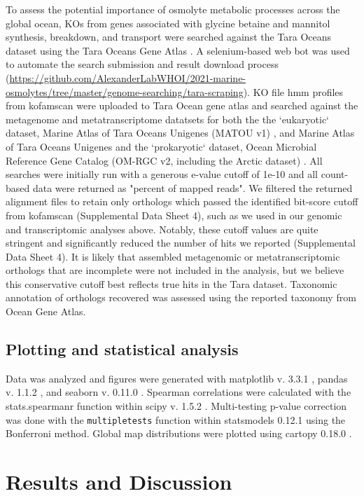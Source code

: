 \documentclass[utf8]{frontiersSCNS} %
\begin{document}
To assess the potential importance of osmolyte metabolic processes across the global ocean, KOs from genes associated with glycine betaine and mannitol synthesis, breakdown, and transport were searched against the Tara Oceans dataset using the Tara Oceans Gene Atlas \citep{Villar_2018}. A selenium-based web bot was used to automate the search submission and result download process (\url{https://github.com/AlexanderLabWHOI/2021-marine-osmolytes/tree/master/genome-searching/tara-scraping}). KO file hmm profiles from kofamscan were uploaded to Tara Ocean gene atlas and searched against the metagenome and metatranscriptome datatsets for both the the `eukaryotic` dataset, Marine Atlas of Tara Oceans Unigenes (MATOU v1) \citep{Carradec2018}, and Marine Atlas of Tara Oceans Unigenes and the `prokaryotic` dataset, Ocean Microbial Reference Gene Catalog (OM-RGC v2, including the Arctic dataset) \citep{Salazar_2019}. All searches were initially run with a generous e-value cutoff of 1e-10 and all count-based data were returned as "percent of mapped reads". We filtered the returned alignment files to retain only orthologs which passed the identified bit-score cutoff from kofamscan (Supplemental Data Sheet 4), such as we used in our genomic and transcriptomic analyses above. Notably, these cutoff values are quite stringent and significantly reduced the number of hits we reported (Supplemental Data Sheet 4). It is likely that assembled metagenomic or metatranscriptomic orthologs that are incomplete were not included in the analysis, but we believe this conservative cutoff best reflects true hits in the Tara dataset. Taxonomic annotation of orthologs recovered was assessed using the reported taxonomy from Ocean Gene Atlas. 

\subsection{Plotting and statistical analysis}

Data was analyzed and figures were generated with matplotlib v. 3.3.1 \citep{Hunter:2007}, pandas v. 1.1.2 \citep{reback2020pandas}, and seaborn v. 0.11.0 \citep{waskom2020seaborn}. Spearman correlations were calculated with the stats.spearmanr function within scipy v. 1.5.2 \citep{2020SciPy-NMeth}. Multi-testing p-value correction was done with the \texttt{multipletests} function within statsmodels 0.12.1 using the Bonferroni method. Global map distributions were plotted using cartopy 0.18.0 \citep{Cartopy}.

\section{Results and Discussion}
\end{document}
